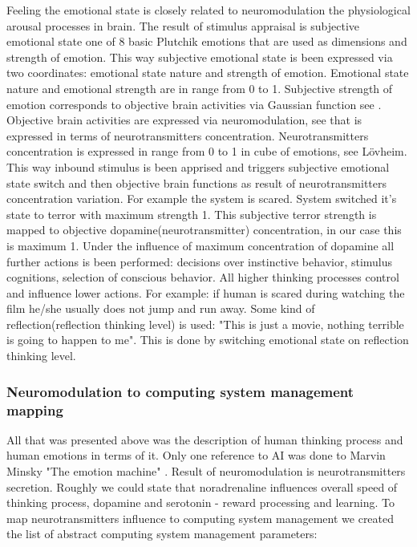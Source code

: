 Feeling the emotional state is closely related to neuromodulation the physiological arousal processes in brain. The result of stimulus appraisal is subjective emotional state one of 8 basic Plutchik emotions that are used as dimensions and strength of emotion. This way subjective emotional state is been expressed via two coordinates: emotional state nature and strength of emotion. Emotional state nature and emotional strength are in range from 0 to 1. Subjective strength of emotion corresponds to objective brain activities via Gaussian function see \cite{hourglass}. Objective brain activities are expressed via neuromodulation, see \cite{emotionsbraintorobot} that is expressed in terms of neurotransmitters concentration. Neurotransmitters  concentration is expressed in range from 0 to 1 in cube of emotions, see Lövheim\cite{cubeofemotions}. This way inbound stimulus is been apprised and triggers subjective emotional state switch and then objective brain functions as result of neurotransmitters concentration variation. For example the system is scared. System switched it's state to terror with maximum strength 1. This subjective terror strength is mapped to objective dopamine(neurotransmitter) concentration, in our case this is maximum 1. Under the influence of maximum concentration of dopamine all further actions is been performed: decisions over instinctive behavior, stimulus cognitions, selection of conscious behavior. All higher thinking processes control and influence lower actions. For example: if human is scared during watching the film he/she usually does not jump and run away. Some kind of reflection(reflection thinking level) is used: "This is just a movie, nothing terrible is going to happen to me". This is done by switching emotional state on reflection thinking level.

\subsubsection{Neuromodulation to computing system management mapping}

All that was presented above was the description of human thinking process and human emotions in terms of it. Only one reference to AI was done to Marvin Minsky "The emotion machine" \cite{emotionmachine}. Result of neuromodulation is neurotransmitters secretion. Roughly we could state that noradrenaline influences overall speed of thinking process, dopamine and serotonin - reward processing and learning. To map neurotransmitters influence to computing system management we created the list of abstract computing system management parameters:

